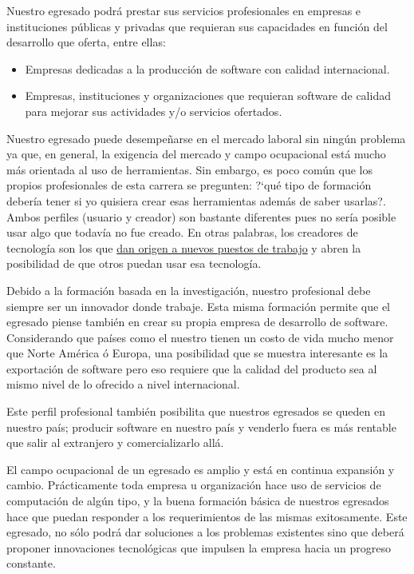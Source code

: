 Nuestro egresado podrá prestar sus servicios profesionales en empresas e instituciones públicas y privadas 
que requieran sus capacidades en función del desarrollo que oferta, entre ellas:

\begin{itemize}
\item Empresas dedicadas a la producción de software con calidad internacional.
\item Empresas, instituciones y organizaciones que requieran software de calidad para mejorar sus actividades y/o servicios ofertados.
\end{itemize}

Nuestro egresado puede desempeñarse en el mercado laboral sin ningún problema ya que, en general, la 
exigencia del mercado y campo ocupacional está mucho más orientada al uso de herramientas. Sin embargo, 
es poco común que los propios profesionales de esta carrera se pregunten: ?`qué tipo de formación deberí­a 
tener si yo quisiera crear esas herramientas además de saber usarlas?. Ambos perfiles (usuario y creador) 
son bastante diferentes pues no serí­a posible usar algo que todaví­a no fue creado. En otras palabras, 
los creadores de tecnologí­a son los que \underline{dan origen a nuevos puestos de trabajo} y abren la 
posibilidad de que otros puedan usar esa tecnologí­a.

Debido a la formación basada en la investigación, nuestro profesional debe siempre ser un innovador 
donde trabaje. Esta misma formación permite que el egresado piense también en crear su propia empresa 
de desarrollo de software. Considerando que paí­ses como el nuestro tienen un costo de vida mucho menor 
que Norte América ó Europa, una posibilidad que se muestra interesante es la exportación de software 
pero eso requiere que la calidad del producto sea al mismo nivel de lo ofrecido a nivel internacional.

Este perfil profesional también posibilita que nuestros egresados se queden en nuestro paí­s; producir 
software en nuestro paí­s y venderlo fuera es más rentable que salir al extranjero y comercializarlo allá.

El campo ocupacional de un egresado es amplio y está en continua expansión y cambio. Prácticamente 
toda empresa u organización hace uso de servicios de computación de algún tipo, y la buena formación 
básica de nuestros egresados hace que puedan responder a los requerimientos de las mismas exitosamente. 
Este egresado, no sólo podrá dar soluciones a los problemas existentes sino que deberá proponer innovaciones 
tecnológicas que impulsen la empresa hacia un progreso constante.

